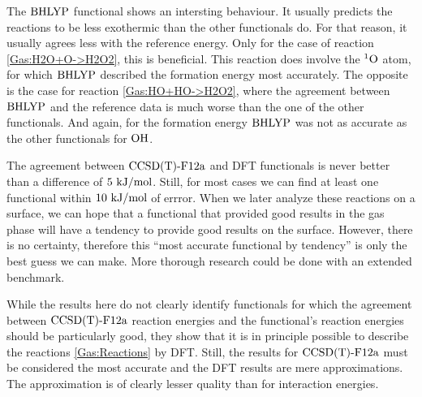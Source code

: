 The $\text{BHLYP}$ functional shows an intersting behaviour. It usually
predicts the reactions to be less exothermic than the other
functionals do.
For that reason, it usually agrees less with the reference energy.
Only for the case of reaction \eqref{Gas:H2O+O->H2O2}, this is beneficial. This
reaction does involve the ${^1\text{O}}$ atom, for which $\text{BHLYP}$ described the
formation energy most accurately. The opposite is the case for reaction
\eqref{Gas:HO+HO->H2O2}, where the agreement between $\text{BHLYP}$ and the reference
data is much worse than the one of the other functionals. And again, for the
formation energy $\text{BHLYP}$ was not as accurate as the other functionals for
$\text O \text H$.

The agreement between $\text{CCSD(T)-F12a}$ and DFT functionals is never better than a
difference of $5~\text {kJ/mol}$. Still, for most cases we can find at least one
functional within $10~\text {kJ/mol}$ of errror. When we later analyze these reactions on
a surface, we can hope that a functional that provided good results in the
gas phase will have a tendency to provide good results on the surface. However,
there is no certainty, therefore this ``most accurate functional by tendency'' is
only the best guess we can make. More thorough research could be done with
an extended benchmark.

While the results here do not clearly identify functionals for which the
agreement between \mbox{$\text{CCSD(T)-F12a}$} reaction energies and the functional's
reaction energies should be particularly good, they show that it is in
principle possible to describe the reactions \eqref{Gas:Reactions} by DFT.
Still, the results for $\text{CCSD(T)-F12a}$ must be considered the most accurate
and the DFT results are mere approximations. The approximation is of
clearly lesser quality than for interaction energies.

